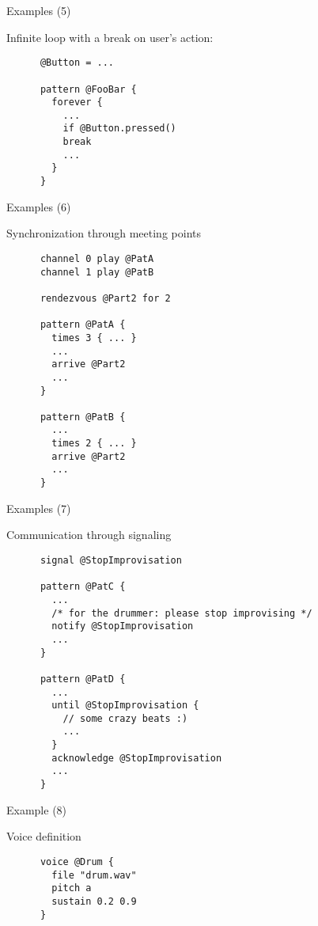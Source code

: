 \documentclass[10pt]{beamer}
\begin{document}
\begin{frame}[fragile]{Examples (5)}
  \begin{block}{Infinite loop with a break on user's action:}
    \begin{lstlisting}
      @Button = ...

      pattern @FooBar {
        forever {
          ...
          if @Button.pressed()
          break
          ...
        }
      }
    \end{lstlisting}
  \end{block}
\end{frame}

\begin{frame}[fragile]{Examples (6)}
  \begin{block}{Synchronization through meeting points}
    \begin{lstlisting}
      channel 0 play @PatA
      channel 1 play @PatB

      rendezvous @Part2 for 2

      pattern @PatA {
        times 3 { ... }
        ...
        arrive @Part2
        ...
      }

      pattern @PatB {
        ...
        times 2 { ... }
        arrive @Part2
        ...
      }
    \end{lstlisting}
  \end{block}
\end{frame}

\begin{frame}[fragile]{Examples (7)}
  \begin{block}{Communication through signaling}
    \begin{lstlisting}
      signal @StopImprovisation

      pattern @PatC {
        ...
        /* for the drummer: please stop improvising */
        notify @StopImprovisation
        ...
      }

      pattern @PatD {
        ...
        until @StopImprovisation {
          // some crazy beats :)
          ...
        }
        acknowledge @StopImprovisation
        ...
      }
    \end{lstlisting}
  \end{block}
\end{frame}

\begin{frame}[fragile]{Example (8)}
  \begin{block}{Voice definition}
    \begin{lstlisting}
      voice @Drum {
        file "drum.wav"
        pitch a
        sustain 0.2 0.9
      }
    \end{lstlisting}
  \end{block}
\end{frame}
\end{document}
